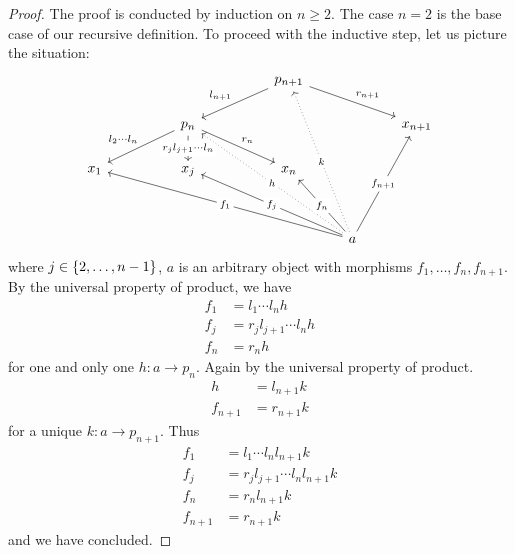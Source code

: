 \begin{proof}
  The proof is conducted by induction on \(n \ge 2\). The case \(n=2\)
  is the base case of our recursive definition. To proceed with the
  inductive step, let us picture the situation:
  \[\begin{tikzcd}
      & & & & p_{n+1} \ar["{l_{n+1}}", dll, swap] \ar["{r_{n+1}}", drr] \\
      & & p_n \ar["{l_2\cdots{}l_n}", dll, swap] \ar["{r_jl_{j+1}\cdots{}l_n}" description, d] \ar["{r_n}", drr] & & & & x_{n+1} \\
      x_1 & & x_j & & x_n \\
      \\
      & & & & & a \ar["{f_1}" description, uulllll] \ar["{f_j}"
      description, uulll] \ar["h" description, uuulll, dotted]
      \ar["{f_n}" description, uul] \ar["k" description, uuuul,
      dotted] \ar["{f_{n+1}}" description, uuur]
    \end{tikzcd}\] where \(j \in \left\{2, \dots{}, n-1\right\}\), \(a\) is an
  arbitrary object with morphisms \(f_1, \dots{}, f_n, f_{n+1}\). By
  the universal property of product, we have
  \[\begin{aligned}
    f_1 &= l_1 \cdots{} l_n h \\
    f_j &= r_jl_{j+1} \cdots{} l_n h \\
    f_n &= r_n h
  \end{aligned}\]
for one and only one \(h : a \to p_n\). Again by the universal property of product.
\[\begin{aligned}
  h &= l_{n+1} k \\
  f_{n+1} &= r_{n+1} k
\end{aligned}\]
for a unique \(k : a \to p_{n+1}\). Thus
\[\begin{aligned}
  f_1 &= l_1 \cdots{} l_n l_{n+1} k \\
  f_j &= r_jl_{j+1} \cdots{} l_n l_{n+1} k \\
  f_n &= r_n l_{n+1} k \\
  f_{n+1} &= r_{n+1} k
\end{aligned}\]
and we have concluded.
\end{proof}

